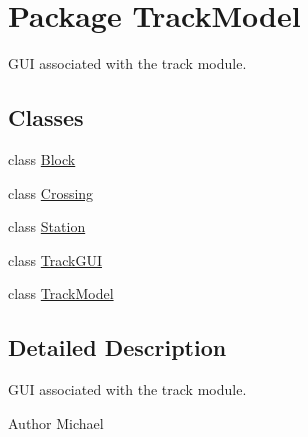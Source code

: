 \hypertarget{namespaceTrackModel}{}\section{Package Track\+Model}
\label{namespaceTrackModel}


G\+UI associated with the track module.  


\subsection*{Classes}
\begin{DoxyCompactItemize}
\item 
class \hyperlink{classTrackModel_1_1Block}{Block}
\item 
class \hyperlink{classTrackModel_1_1Crossing}{Crossing}
\item 
class \hyperlink{classTrackModel_1_1Station}{Station}
\item 
class \hyperlink{classTrackModel_1_1TrackGUI}{Track\+G\+UI}
\item 
class \hyperlink{classTrackModel_1_1TrackModel}{Track\+Model}
\end{DoxyCompactItemize}


\subsection{Detailed Description}
G\+UI associated with the track module. 

\begin{DoxyAuthor}{Author}
Michael 
\end{DoxyAuthor}
